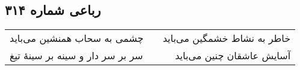 \begin{center}
\section*{رباعی شماره ۳۱۴}
\label{sec:sh314}
\begin{longtable}{l p{0.5cm} r}
چشمی به سحاب همنشین می‌باید
&&
خاطر به نشاط خشمگین می‌باید
\\
سر بر سر دار و سینه بر سینهٔ تیغ
&&
آسایش عاشقان چنین می‌باید
\\
\end{longtable}
\end{center}

